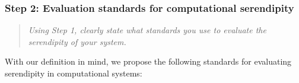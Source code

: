 \subsubsection*{ Step 2: Evaluation standards for computational serendipity}
\begin{quote} {\em Using Step 1, clearly state what standards you use to evaluate the serendipity of your
    system. }\end{quote}

With our definition in mind, we propose the following standards for evaluating serendipity in computational systems:


